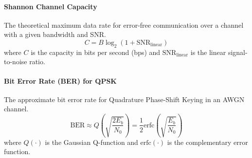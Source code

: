 \paragraph{Shannon Channel Capacity}
The theoretical maximum data rate for error-free communication over a channel with a given bandwidth and SNR.
\begin{equation}
    C = B \log_2(1 + \text{SNR}_{\text{linear}})
\end{equation}
where \(C\) is the capacity in bits per second (bps) and \(\text{SNR}_{\text{linear}}\) is the linear signal-to-noise ratio.

\paragraph{Bit Error Rate (BER) for QPSK}
The approximate bit error rate for Quadrature Phase-Shift Keying in an AWGN channel.
\begin{equation}
    \text{BER} \approx Q\left(\sqrt{\frac{2E_b}{N_0}}\right) = \frac{1}{2}\text{erfc}\left(\sqrt{\frac{E_b}{N_0}}\right)
\end{equation}
where \(Q(\cdot)\) is the Gaussian Q-function and \(\text{erfc}(\cdot)\) is the complementary error function.

